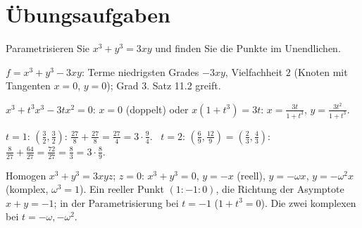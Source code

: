 \section{Übungsaufgaben}

\begin{aufgabe}
Parametrisieren Sie $x^{3} + y^{3} = 3xy$ und finden Sie die Punkte im Unendlichen.

\loesung
{}
$f = x^{3} + y^{3} - 3xy$: Terme niedrigsten Grades $-3xy$, Vielfachheit $2$ (Knoten mit Tangenten $x = 0$, $y = 0$); Grad $3$. Satz 11.2 greift.

$x^{3} + t^{3}x^{3} - 3tx^{2} = 0$: $x = 0$ (doppelt) oder $x(1 + t^{3}) = 3t$: $x = \frac{3t}{1 + t^{3}}$, $y = \frac{3t^{2}}{1 + t^{3}}$.

$t = 1$: $(\tfrac32, \tfrac32)$: $\tfrac{27}{8} + \tfrac{27}{8} = \tfrac{27}{4} = 3\cdot\tfrac94$. \checkmark\ $t = 2$: $(\tfrac69, \tfrac{12}{9}) = (\tfrac23, \tfrac43)$: $\tfrac{8}{27} + \tfrac{64}{27} = \tfrac{72}{27} = \tfrac83 = 3\cdot\tfrac89$. \checkmark

Homogen $x^{3} + y^{3} = 3xyz$; $z = 0$: $x^{3} + y^{3} = 0$, $y = -x$ (reell), $y = -\omega x$, $y = -\omega^{2}x$ (komplex, $\omega^{3} = 1$). Ein reeller Punkt $(1 : -1 : 0)$, die Richtung der Asymptote $x + y = -1$; in der Parametrisierung bei $t = -1$ ($1 + t^{3} = 0$). Die zwei komplexen bei $t = -\omega, -\omega^{2}$.

\begin{center}
\begin{minipage}{0.88\textwidth}
\end{minipage}
\end{center}
\end{aufgabe}

